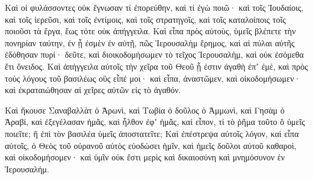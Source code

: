 {\par }{\PP {}Καὶ οἱ φυλάσσοντες οὐκ ἔγνωσαν τί ἐπορεύθην, καὶ τί ἐγὼ ποιῶ· καὶ τοῖς Ἰουδαίοις, καὶ τοῖς ἱερεῦσι, καὶ τοῖς ἐντίμοις, καὶ τοῖς στρατηγοῖς, καὶ τοῖς καταλοίποις τοῖς ποιοῦσι τὰ ἔργα, ἕως τότε οὐκ ἀπήγγειλα.
Καὶ εἶπα πρὸς αὐτοὺς, ὑμεῖς βλέπετε τὴν πονηρίαν ταύτην, ἐν ᾗ ἐσμὲν ἐν αὐτῇ, πῶς Ἱερουσαλὴμ ἔρημος, καὶ αἱ πύλαι αὐτῆς ἐδόθησαν πυρί· δεῦτε, καὶ διοικοδομήσωμεν τὸ τεῖχος Ἱερουσαλὴμ, καὶ οὐκ ἐσόμεθα ἔτι ὄνειδος.
Καὶ ἀπήγγειλα αὐτοῖς τὴν χεῖρα τοῦ Θεοῦ ᾗ ἐστιν ἀγαθὴ ἐπʼ ἐμὲ, καὶ πρὸς τοὺς λόγους τοῦ βασιλέως οὓς εἶπέ μοι· καὶ εἶπα, ἀναστῶμεν, καὶ οἰκοδομήσωμεν· καὶ ἐκραταιώθησαν αἱ χεῖρες αὐτῶν εἰς τὸ ἀγαθόν.
\par }{\PP {}Καὶ ἤκουσε Σαναβαλλὰτ ὁ Ἀρωνὶ, καὶ Τωβία ὁ δοῦλος ὁ Ἀμμωνὶ, καὶ Γησὰμ ὁ Ἀραβί, καὶ ἐξεγέλασαν ἡμᾶς, καὶ ἦλθον ἐφʼ ἡμᾶς, καὶ εἶπον, τί τὸ ῥῆμα τοῦτο ὃ ὑμεῖς ποιεῖτε; ἢ ἐπὶ τὸν βασιλέα ὑμεῖς ἀποστατεῖτε;
Καὶ ἐπέστρεψα αὐτοῖς λόγον, καὶ εἶπα αὐτοῖς, ὁ Θεὸς τοῦ οὐρανοῦ αὐτὸς εὐοδώσει ἡμῖν, καὶ ἡμεῖς δοῦλοι αὐτοῦ καθαροὶ, καὶ οἰκοδομήσομεν· καὶ ὑμῖν οὐκ ἔστι μερὶς καὶ δικαιοσύνη καὶ μνημόσυνον ἐν Ἱερουσαλήμ.

}
